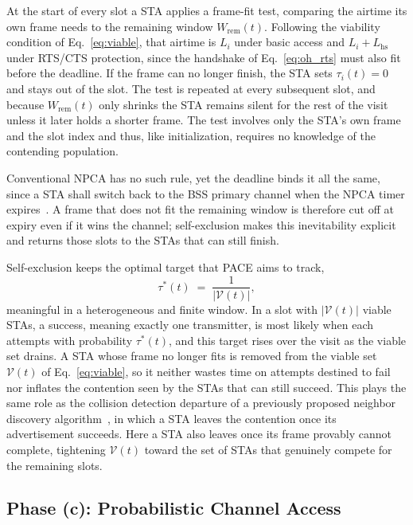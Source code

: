\documentclass[a4paper,fleqn]{cas-dc}
\begin{document}
At the start of every slot a STA applies a frame-fit test, comparing the airtime its own frame needs to the remaining window $W_\mathrm{rem}(t)$. Following the viability condition of Eq.~\eqref{eq:viable}, that airtime is $L_i$ under basic access and $L_i+L_\mathrm{hs}$ under RTS/CTS protection, since the handshake of Eq.~\eqref{eq:oh_rts} must also fit before the deadline. If the frame can no longer finish, the STA sets $\tau_i(t)=0$ and stays out of the slot. The test is repeated at every subsequent slot, and because $W_\mathrm{rem}(t)$ only shrinks the STA remains silent for the rest of the visit unless it later holds a shorter frame. The test involves only the STA's own frame and the slot index and thus, like initialization, requires no knowledge of the contending population.

Conventional NPCA has no such rule, yet the deadline binds it all the same, since a STA shall switch back to the BSS primary channel when the NPCA timer expires~\citep{ieee80211bn}. A frame that does not fit the remaining window is therefore cut off at expiry even if it wins the channel; self-exclusion makes this inevitability explicit and returns those slots to the STAs that can still finish.

Self-exclusion keeps the optimal target that PACE aims to track,
\begin{equation}
    \tau^*(t) \;=\; \frac{1}{|\mathcal{V}(t)|},
    \label{eq:tau_opt}
\end{equation}
meaningful in a heterogeneous and finite window. In a slot with $|\mathcal{V}(t)|$ viable STAs, a success, meaning exactly one transmitter, is most likely when each attempts with probability $\tau^*(t)$, and this target rises over the visit as the viable set drains. A STA whose frame no longer fits is removed from the viable set $\mathcal{V}(t)$ of Eq.~\eqref{eq:viable}, so it neither wastes time on attempts destined to fail nor inflates the contention seen by the STAs that can still succeed. This plays the same role as the collision detection departure of a previously proposed neighbor discovery algorithm~\citep{song2014pnd}, in which a STA leaves the contention once its advertisement succeeds. Here a STA also leaves once its frame provably cannot complete, tightening $\mathcal{V}(t)$ toward the set of STAs that genuinely compete for the remaining slots.

\subsection{Phase (c): Probabilistic Channel Access}
\label{subsec:channel_access}
\end{document}

